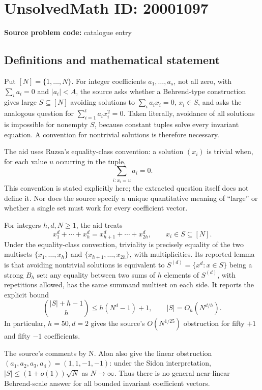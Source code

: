 \documentclass[11pt]{article}
\begin{document}
\section*{UnsolvedMath ID: 20001097}
\textbf{Source problem code:} catalogue entry
\subsection{Definitions and mathematical statement}
Put \([N]=\{1,\ldots,N\}\). For integer coefficients \(a_1,\ldots,a_s\), not all zero, with \(\sum_i a_i=0\) and \(|a_i|<A\), the source asks whether a Behrend-type construction gives large \(S\subseteq[N]\) avoiding solutions to \(\sum_i a_ix_i=0\), \(x_i\in S\), and asks the analogous question for \(\sum_{i=1}^t a_ix_i^2=0\). Taken literally, avoidance of all solutions is impossible for nonempty \(S\), because constant tuples solve every invariant equation. A convention for nontrivial solutions is therefore necessary.

The aid uses Ruzsa's equality-class convention: a solution \((x_i)\) is trivial when, for each value \(u\) occurring in the tuple,
\[
 \sum_{i:x_i=u}a_i=0.
\]
This convention is stated explicitly here; the extracted question itself does not define it. Nor does the source specify a unique quantitative meaning of ``large'' or whether a single set must work for every coefficient vector.

For integers \(h,d,N\geq1\), the aid treats
\[
 x_1^d+\cdots+x_h^d=x_{h+1}^d+\cdots+x_{2h}^d,\qquad x_i\in S\subseteq[N].
\]
Under the equality-class convention, triviality is precisely equality of the two multisets \(\{x_1,\ldots,x_h\}\) and \(\{x_{h+1},\ldots,x_{2h}\}\), with multiplicities. Its reported lemma is that avoiding nontrivial solutions is equivalent to \(S^{(d)}=\{x^d:x\in S\}\) being a strong \(B_h\) set: any equality between two sums of \(h\) elements of \(S^{(d)}\), with repetitions allowed, has the same summand multiset on each side. It reports the explicit bound
\[
 \binom{|S|+h-1}{h}\leq h(N^d-1)+1,
 \qquad |S|=O_h(N^{d/h}).
\]
In particular, \(h=50,d=2\) gives the source's \(O(N^{1/25})\) obstruction for fifty \(+1\) and fifty \(-1\) coefficients.

The source's comments by N. Alon also give the linear obstruction \((a_1,a_2,a_3,a_4)=(1,1,-1,-1)\): under the Sidon interpretation, \(|S|\leq(1+o(1))\sqrt N\) as \(N\to\infty\). Thus there is no general near-linear Behrend-scale answer for all bounded invariant coefficient vectors.
\end{document}
